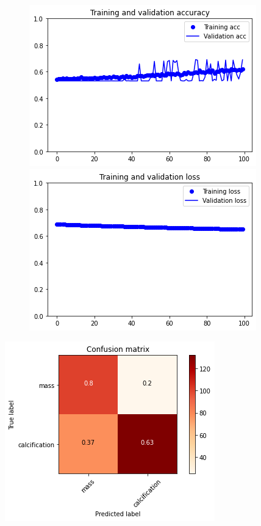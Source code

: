 \documentclass{article}
\begin{document}
\begin{figure}[h]
    \centering
    \begin{minipage}{0.45\textwidth}
        \centering
        \includegraphics[scale=0.46]{./img/preTrainValResNet50_fe.png}
    \end{minipage}\hfill
    \begin{minipage}{0.45\textwidth}
        \centering
        \includegraphics[scale=0.46]{./img/preTrainLossResNet50_fe.png}
    \end{minipage}
\end{figure}

\begin{center}
\begin{minipage}{0.45\textwidth}
        \includegraphics[scale=0.6]{./img/cmPreTrainResNet50_fe.png}
    \end{minipage}
\end{center}
\end{document}
